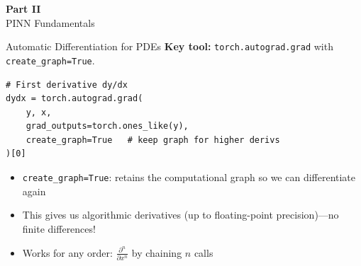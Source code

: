 \documentclass[aspectratio=169,11pt]{beamer}
\newcommand{\emphc}[1]{\textcolor{harvardcrimson}{#1}}
\begin{document}

\begin{frame}{}
\vfill
\begin{center}
{\Huge \textcolor{uzhblue}{\textbf{Part II}}}\\[12pt]
{\LARGE PINN Fundamentals}
\end{center}
\vfill
\end{frame}

\begin{frame}[fragile]{Automatic Differentiation for PDEs}
\textbf{Key tool:} \texttt{torch.autograd.grad} with \texttt{create\_graph=True}.

\vspace{0.4em}
\begin{lstlisting}
# First derivative dy/dx
dydx = torch.autograd.grad(
    y, x,
    grad_outputs=torch.ones_like(y),
    create_graph=True   # keep graph for higher derivs
)[0]
\end{lstlisting}

\vspace{0.3em}
\begin{itemize}
    \item \texttt{create\_graph=True}: retains the computational graph so we can differentiate \emphc{again}
    \item This gives us \emphc{algorithmic} derivatives (up to floating-point precision)---no finite differences!
    \item Works for \emphc{any order}: $\frac{\partial^n}{\partial x^n}$ by chaining $n$ calls
\end{itemize}
\end{frame}
\end{document}

